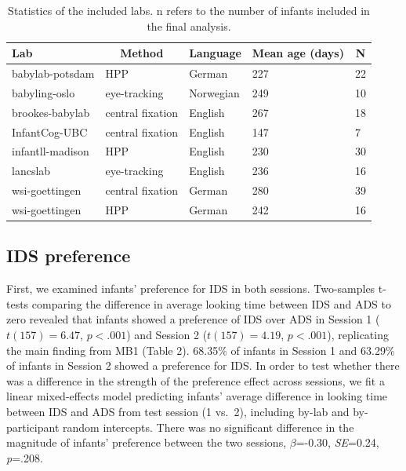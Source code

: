 \documentclass[
  man,floatsintext]{apa6}
\begin{document}
\begin{table}[tbp]

\begin{center}
\begin{threeparttable}

\caption{\label{tab:labs}Statistics of the included labs. n refers to the number of infants included in the final analysis.}

\begin{tabular}{lllll}
\toprule
Lab & \multicolumn{1}{c}{Method} & \multicolumn{1}{c}{Language} & \multicolumn{1}{c}{Mean age (days)} & \multicolumn{1}{c}{N}\\
\midrule
babylab-potsdam & HPP & German & 227 & 22\\
babyling-oslo & eye-tracking & Norwegian & 249 & 10\\
brookes-babylab & central fixation & English & 267 & 18\\
InfantCog-UBC & central fixation & English & 147 & 7\\
infantll-madison & HPP & English & 230 & 30\\
lancslab & eye-tracking & English & 236 & 16\\
wsi-goettingen & central fixation & German & 280 & 39\\
wsi-goettingen & HPP & German & 242 & 16\\
\bottomrule
\end{tabular}

\end{threeparttable}
\end{center}

\end{table}

\hypertarget{ids-preference}{%
\subsection{IDS preference}\label{ids-preference}}

First, we examined infants' preference for IDS in both sessions. Two-samples t-tests comparing the difference in average looking time between IDS and ADS to zero revealed that infants showed a preference of IDS over ADS in Session 1 (\(t(157) = 6.47\), \(p < .001\)) and Session 2 (\(t(157) = 4.19\), \(p < .001\)), replicating the main finding from MB1 (Table 2).
68.35\% of infants in Session 1 and 63.29\% of infants in Session 2 showed a preference for IDS.
In order to test whether there was a difference in the strength of the preference effect across sessions, we fit a linear mixed-effects model predicting infants' average difference in looking time between IDS and ADS from test session (1 vs.~2), including by-lab and by-participant random intercepts.
There was no significant difference in the magnitude of infants' preference between the two sessions, \(\beta\)=-0.30, \emph{SE}=0.24, \emph{p}=.208.
\end{document}
